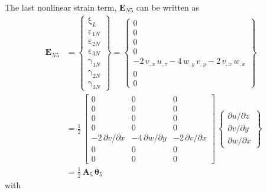 The last nonlinear strain term, $\mathbf{E}_{N5}$ can be written as
\begin{equation}
	\begin{aligned}
		\mathbf{E}_{N5} & =  \begin{Bmatrix}
			\mathrm \xi_{L} \\
			\mathrm \varepsilon_{1N} \\                    
			\mathrm \varepsilon_{2N} \\           
			\mathrm \varepsilon_{3N} \\           
			\mathrm \gamma_{1N} \\                
			\mathrm \gamma_{2N} \\                
			\mathrm \gamma_{3N} \end{Bmatrix} =   
		\begin{Bmatrix}                       
			0\\
			0   \\
			0  \\
			0  \\ 
			-2 \, v_{,x} \, u_{,z} - 4 \, w_{,y} \, v_{,y}  - 2 \, v_{,x} \, w_{,x} \\
			0 \\ 
			0 \end{Bmatrix} \\
		& = \frac{1}{2} \, \begin{bmatrix}
			0 & 0 &  0   \\
			0 &  0 & 0  \\
			0 &  0 & 0 \\
			0 &  0 & 0 \\
			- 2 \, \partial v / \partial x & - 4 \, \partial w / \partial y & - 2 \, \partial v / \partial x  \\
			0 &  0 & 0  \\
			0 &  0 & 0  \end{bmatrix} \, \begin{Bmatrix}
			\partial u / \partial z\\
			\partial v / \partial y \\
			\partial w / \partial x
		\end{Bmatrix} \\
	    &	= \tfrac{1}{2} \, \mathbf{A}_5 \, \boldsymbol{\theta}_5
	\end{aligned}
\end{equation}
with  

